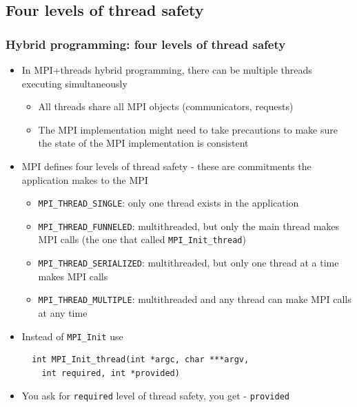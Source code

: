 \documentclass{beamer}
\begin{document}
\subsection{Four levels of thread safety}
\begin{frame}[fragile]
  \frametitle{Hybrid programming: four levels of thread safety}
\begin{itemize}
\item In MPI+threads hybrid programming, there can be multiple threads executing simultaneously
\begin{itemize}
\item All threads share all MPI objects (communicators, requests)
\item The MPI implementation might need to take precautions to make sure the state of the MPI implementation is consistent
\end{itemize}
\item MPI defines four levels of thread safety - these are commitments the application makes to the MPI
\begin{itemize}
\item {\color{mycolorcode}\verb|MPI_THREAD_SINGLE|}: only one thread exists in the application
\item {\color{mycolorcode}\verb|MPI_THREAD_FUNNELED|}: multithreaded, but only the main thread makes MPI calls (the one that called {\color{mycolorcode}\verb|MPI_Init_thread|})
\item {\color{mycolorcode}\verb|MPI_THREAD_SERIALIZED|}: multithreaded, but only one thread at a time makes MPI calls
\item {\color{mycolorcode}\verb|MPI_THREAD_MULTIPLE|}: multithreaded and any thread can make MPI calls at any time
\end{itemize}
\item Instead of {\color{mycolorcode}\verb|MPI_Init|} use
{\color{mycolorcode}
\begin{verbatim}
  int MPI_Init_thread(int *argc, char ***argv, 
    int required, int *provided)
\end{verbatim}
}
\item You ask for {\color{mycolorcode}\verb|required|} level of thread safety, you get - {\color{mycolorcode}\verb|provided|}
\end{itemize}
\end{frame}
\end{document}
